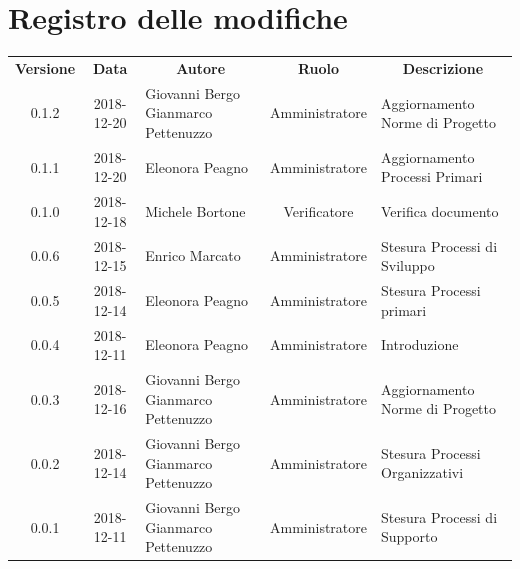 \documentclass[11pt,a4paper]{article}
\begin{document}
	

	
	\newpage
	\section*{\centering Registro delle modifiche}
	\begin{tabularx}{\textwidth}{ c | c | X | c | X }
		\rowcolor{LightBlue}
		\color{white}\bfseries Versione & \color{white}\bfseries Data & \multicolumn{1}{c}{\color{white}\bfseries Autore}
		 & \color{white}\bfseries Ruolo & \multicolumn{1}{c}{\color{white}\bfseries Descrizione}\\[0.25cm]
		0.1.2 & 2018-12-20 & Giovanni Bergo \newline Gianmarco Pettenuzzo & Amministratore & Aggiornamento Norme di Progetto \\ \hline
		0.1.1 & 2018-12-20 & Eleonora Peagno & Amministratore & Aggiornamento Processi Primari \\ \hline
		0.1.0 & 2018-12-18 & Michele Bortone & Verificatore & Verifica documento \\ \hline
		0.0.6 & 2018-12-15 & Enrico Marcato & Amministratore & Stesura Processi di \newline Sviluppo \\ \hline
		0.0.5 & 2018-12-14 & Eleonora Peagno & Amministratore & Stesura Processi primari \\ \hline
		0.0.4 & 2018-12-11 & Eleonora Peagno & Amministratore & Introduzione \\ \hline
	0.0.3 & 2018-12-16 & Giovanni Bergo \newline Gianmarco Pettenuzzo & Amministratore & Aggiornamento Norme di Progetto \\ \hline
	0.0.2 & 2018-12-14 & Giovanni Bergo \newline Gianmarco Pettenuzzo & Amministratore & Stesura Processi \newline Organizzativi \\ \hline
	0.0.1 & 2018-12-11 & Giovanni Bergo \newline Gianmarco Pettenuzzo & Amministratore & Stesura Processi di \newline Supporto \\ \hline


	
		
	
	\end{tabularx}

	\newpage	

	\renewcommand  \contentsname {\Large Indice} 
	
\end{document}
